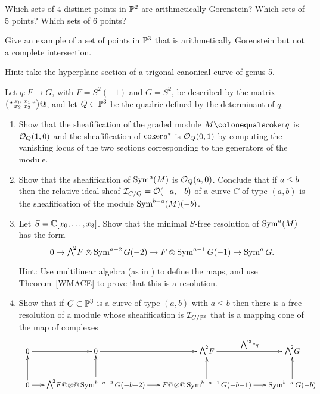 \begin{exercise}
Which sets of 4 distinct points in ${\mathbb P}^2$ are arithmetically
Gorenstein? Which sets of 5 points? Which sets of 6 points?
\end{exercise}

\begin{exercise}
Give an example of a set of points in ${\mathbb P}^3$ that is arithmetically
Gorenstein but not a complete intersection.

Hint: take the
hyperplane section of a trigonal canonical curve of genus 5.
\end{exercise}

\begin{exercise}
Let $q:F\to G$, with $F = S^2(-1)$ and $G = S^2$,
be described by the matrix $\bigl(` `\begin{smallmatrix} x_0&x_1\\ x_2&x_3 \end{smallmatrix}` `\bigr)@$, and let $Q\subset {\mathbb P}^3$ be the quadric defined by the determinant of $q$.
\begin{enumerate}

\item Show that the sheafification of the graded module $M \colonequals
\coker q$ is ${\mathcal O}_Q(1,0)$ and the sheafification
of ${\rm{coker}\kern1pt} q^*$ is ${\mathcal O}_Q(0,1)$ by computing the vanishing locus
of the two sections corresponding to the generators of the module.

\item Show that the sheafification of $\operatorname{Sym}^a(M)$ is
${\mathcal O}_Q(a,0)$. Conclude that
if $a\leq \nobreak b$ then the relative ideal sheaf ${\mathcal I}_{C/Q} = {\mathcal O}(-a,-b)$
of a curve $C$ of type $(a,b)$
is the sheafification of the module $\operatorname{Sym}^{b-a}(M)(-b)$.

\item Let $S = {\mathbb C}[x_0,\dots, x_3]$. Show that the minimal $S$-free
resolution of $\operatorname{Sym}^a(M)$
has the form
$$
0 \to \mwedge^2 F \otimes \Sym^{a-2} G(-2)\to F\otimes \Sym^{a-1}
G(-1)\to \Sym^a G.
$$

Hint: Use multilinear algebra (as in \cite{Eisenbud1995}) to define the
maps, and use
Theorem~\ref{WMACE} to prove that this is a resolution.

\item Show that if $C\subset {\mathbb P}^3$ is a curve of type $(a, b)$ with
$a\leq b$ then
there is a free resolution of a module
whose sheafification is ${\mathcal I}_{C/{\mathbb P}^3}$ that is a mapping cone of the
map of complexes
\vspace*{-10pt}
$$
\small
\quad
\medmuskip0mu
\xymatrix@C=15pt{
0\ar[r]  &0\ar[r]& \mwedge^2 F \ar[r]^ {\ssty\bigwedge^{`2}``q}&\mwedge^2 G\\
0\ar[r]\ar[u]  & \mwedge^2 F @\otimes@ \Sym^{b-a-2} G(-b-2) \ar[r]\ar[u]  
&F @\otimes@\Sym^{b-a-1} G(-b-1) \ar[r]\ar[u]& \Sym^{b-a} G(-b)\ar[u]
}
\vspace*{5pt}
$$


\end{enumerate}
\end{exercise}
